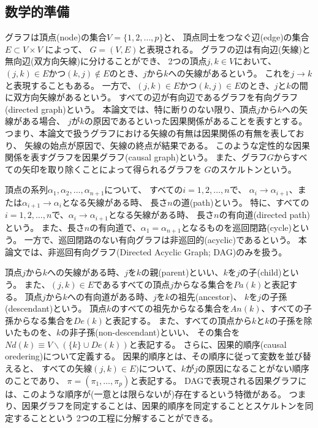 
\subsection{数学的準備}

グラフは頂点(node)の集合$V=\{1,2,\dots,p\}$と、
頂点同士をつなぐ辺(edge)の集合$E\subset V \times V$ によって、
$G=(V,E)$と表現される。
グラフの辺は有向辺(矢線)と無向辺(双方向矢線)に分けることができ、
2つの頂点$j,k\in V$において、
$(j,k)\in E$かつ$(k,j)\notin E$のとき、$j$から$k$への矢線があるという。
これを$j \rightarrow k$と表現することもある。
一方で、$(j,k)\in E$かつ$(k,j)\in E$のとき、$j$と$k$の間に双方向矢線があるという。
すべての辺が有向辺であるグラフを有向グラフ(directed graph)という。
本論文では、特に断りのない限り、頂点$j$から$k$への矢線がある場合、
$j$が$k$の原因であるといった因果関係があることを表すとする。
つまり、本論文で扱うグラフにおける矢線の有無は因果関係の有無を表しており、
矢線の始点が原因で、矢線の終点が結果である。
このような定性的な因果関係を表すグラフを因果グラフ(causal graph)という。
また、グラフ$G$からすべての矢印を取り除くことによって得られるグラフを
$G$のスケルトンという。

頂点の系列$\alpha_1, \alpha_2, \dots, \alpha_{n+1}$について、
すべての$i=1,2,\dots, n$で、
$\alpha_i \rightarrow \alpha_{i+1}$、または$\alpha_{i+1} \rightarrow \alpha_i$となる矢線がある時、
長さ$n$の道(path)という。
特に、すべての$i=1,2,\dots, n$で、$\alpha_i \rightarrow \alpha_{i+1}$となる矢線がある時、
長さ$n$の有向道(directed path)という。
また、長さ$n$の有向道で、$\alpha_1 = \alpha_{n+1}$となるものを巡回閉路(cycle)という。
一方で、巡回閉路のない有向グラフは非巡回的(acyclic)であるという。
本論文では、非巡回有向グラフ(Directed Acyclic Graph; DAG)のみを扱う。

頂点$j$から$k$への矢線がある時、$j$を$k$の親(parent)といい、$k$を$j$の子(child)という。
また、$(j,k)\in E$であるすべての頂点$j$からなる集合を$Pa(k)$と表記する。
頂点$j$から$k$への有向道がある時、$j$を$k$の祖先(ancestor)、
$k$を$j$の子孫(descendant)という。
頂点$k$のすべての祖先からなる集合を$An(k)$、すべての子孫からなる集合を$De(k)$と表記する。
また、すべての頂点から$k$と$k$の子孫を除いたものを、$k$の非子孫(non-descendant)といい、
その集合を$Nd(k) \equiv V \backslash (\{k \} \cup De(k))$と表記する。
さらに、因果的順序(causal oredering)について定義する。
因果的順序とは、その順序に従って変数を並び替えると、
すべての矢線$(j,k)\in E)$について、$k$が$j$の原因になることがない順序のことであり、
$\pi =(\pi_1, \dots, \pi_p)$と表記する。
DAGで表現される因果グラフには、このような順序が(一意とは限らないが)存在するという特徴がある。
つまり、因果グラフを同定することは、因果的順序を同定することとスケルトンを同定することという
2つの工程に分解することができる。

